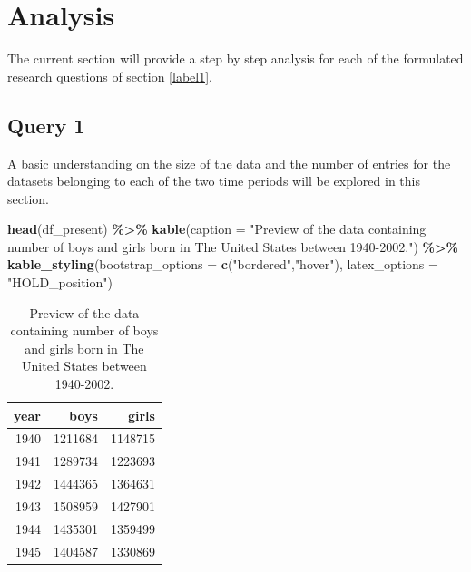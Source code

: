\documentclass[11pt,a4paper,]{article}
\newenvironment{Shaded}{\begin{snugshade}}{\end{snugshade}}
\newcommand{\AttributeTok}[1]{\textcolor[rgb]{0.13,0.29,0.53}{#1}}
\newcommand{\FunctionTok}[1]{\textcolor[rgb]{0.13,0.29,0.53}{\textbf{#1}}}
\newcommand{\NormalTok}[1]{#1}
\newcommand{\SpecialCharTok}[1]{\textcolor[rgb]{0.81,0.36,0.00}{\textbf{#1}}}
\newcommand{\StringTok}[1]{\textcolor[rgb]{0.31,0.60,0.02}{#1}}
\begin{document}
\hypertarget{label2}{%
\section{Analysis}\label{label2}}

The current section will provide a step by step analysis for each of the formulated research questions of section \ref{label1}.

\hypertarget{query-1}{%
\subsection{Query 1}\label{query-1}}

A basic understanding on the size of the data and the number of entries for the datasets belonging to each of the two time periods will be explored in this section.

\tiny

\begin{Shaded}
\begin{Highlighting}[]
\FunctionTok{head}\NormalTok{(df\_present) }\SpecialCharTok{\%\textgreater{}\%} 
  \FunctionTok{kable}\NormalTok{(}\AttributeTok{caption =} \StringTok{"Preview of the data containing number of boys and girls born in The United States between 1940{-}2002."}\NormalTok{) }\SpecialCharTok{\%\textgreater{}\%} 
  \FunctionTok{kable\_styling}\NormalTok{(}\AttributeTok{bootstrap\_options =} \FunctionTok{c}\NormalTok{(}\StringTok{"bordered"}\NormalTok{,}\StringTok{"hover"}\NormalTok{),}
                                    \AttributeTok{latex\_options =} \StringTok{"HOLD\_position"}\NormalTok{) }
\end{Highlighting}
\end{Shaded}

\begin{table}[H]

\caption{\label{tab:tabpre}Preview of the data containing number of boys and girls born in The United States between 1940-2002.}
\centering
\begin{tabular}[t]{r|r|r}
\hline
year & boys & girls\\
\hline
1940 & 1211684 & 1148715\\
\hline
1941 & 1289734 & 1223693\\
\hline
1942 & 1444365 & 1364631\\
\hline
1943 & 1508959 & 1427901\\
\hline
1944 & 1435301 & 1359499\\
\hline
1945 & 1404587 & 1330869\\
\hline
\end{tabular}
\end{table}
\normalsize
\end{document}
